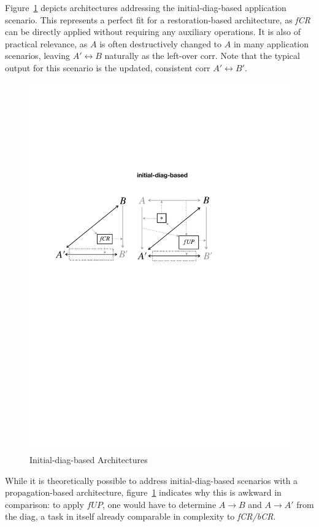 Figure~\ref{fig:initialDiagBased} depicts architectures addressing the initial-diag-based application scenario.
This represents a perfect fit for a restoration-based architecture, as \emph{fCR} can be directly applied without requiring any auxiliary operations.
It is also of practical relevance, as $A$ is often destructively changed to $A$ in many application scenarios, leaving $A' \leftrightarrow B$ naturally as the left-over corr. 
Note that the typical output for this scenario is the updated, consistent corr $A' \leftrightarrow B'$.
%
\begin{figure}[tb!]
	\centering
	\includegraphics[width=0.755\columnwidth]{diagrams/foundations/initial-diag-based}
	\caption{Initial-diag-based Architectures}
	\label{fig:initialDiagBased}
\end{figure}
%
While it is theoretically possible to address initial-diag-based scenarios with a propagation-based architecture, figure~\ref{fig:initialDiagBased} indicates why this is awkward in comparison: to apply $\mathit{fUP}$, one would have to determine $A \rightarrow B$ and $A \rightarrow A'$ from the diag, a task in itself already comparable in complexity to \emph{fCR/bCR}.


